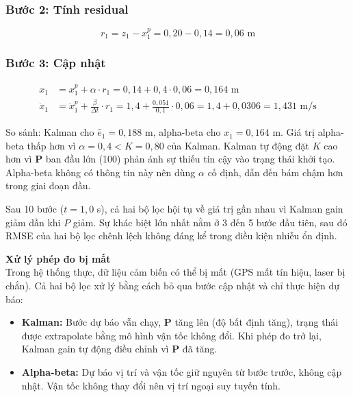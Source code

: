 \subsubsection{Bước 2: Tính residual\\}
\begin{equation}
    r_1 = z_1 - x_1^p = 0{,}20 - 0{,}14 = 0{,}06 \text{ m}
\end{equation}

\subsubsection{Bước 3: Cập nhật\\}
\begin{align*}
    x_1 &= x_1^p + \alpha \cdot r_1 = 0{,}14 + 0{,}4 \cdot 0{,}06 = 0{,}164 \text{ m} \\
    \dot{x}_1 &= \dot{x}_1^p + \frac{\beta}{\Delta t} \cdot r_1 = 1{,}4 + \frac{0{,}051}{0{,}1} \cdot 0{,}06 = 1{,}4 + 0{,}0306 = 1{,}431 \text{ m/s}
\end{align*}

So sánh: Kalman cho $\hat{e}_1 = 0{,}188$ m, alpha-beta cho $x_1 = 0{,}164$ m. Giá trị alpha-beta thấp hơn vì $\alpha = 0{,}4 < K = 0{,}80$ của Kalman. Kalman tự động đặt $K$ cao hơn vì $\mathbf{P}$ ban đầu lớn (100) phản ánh sự thiếu tin cậy vào trạng thái khởi tạo. Alpha-beta không có thông tin này nên dùng $\alpha$ cố định, dẫn đến bám chậm hơn trong giai đoạn đầu.

Sau 10 bước ($t = 1{,}0$ s), cả hai bộ lọc hội tụ về giá trị gần nhau vì Kalman gain giảm dần khi $P$ giảm. Sự khác biệt lớn nhất nằm ở 3 đến 5 bước đầu tiên, sau đó RMSE của hai bộ lọc chênh lệch không đáng kể trong điều kiện nhiễu ổn định.

\textbf{Xử lý phép đo bị mất\\} Trong hệ thống thực, dữ liệu cảm biến có thể bị mất (GPS mất tín hiệu, laser bị chắn). Cả hai bộ lọc xử lý bằng cách bỏ qua bước cập nhật và chỉ thực hiện dự báo:

\begin{itemize}
    \item \textbf{Kalman:} Bước dự báo vẫn chạy, $\mathbf{P}$ tăng lên (độ bất định tăng), trạng thái được extrapolate bằng mô hình vận tốc không đổi. Khi phép đo trở lại, Kalman gain tự động điều chỉnh vì $\mathbf{P}$ đã tăng.
    \item \textbf{Alpha-beta:} Dự báo vị trí và vận tốc giữ nguyên từ bước trước, không cập nhật. Vận tốc không thay đổi nên vị trí ngoại suy tuyến tính.
\end{itemize}

